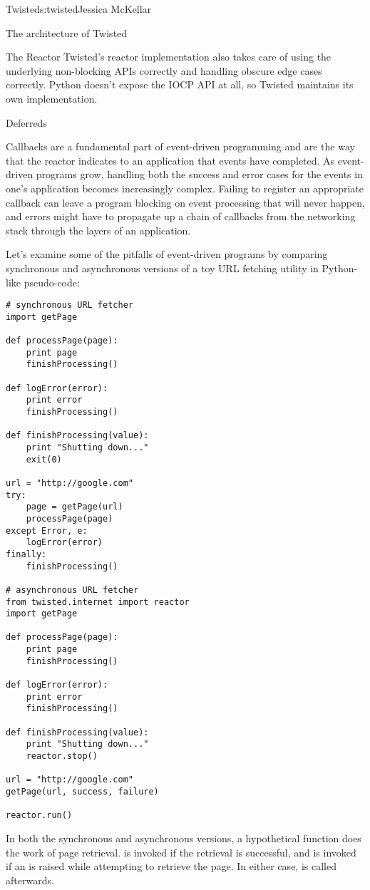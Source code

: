 \begin{aosachapter}{Twisted}{s:twisted}{Jessica McKellar}
\begin{aosasect1}{The architecture of Twisted}
\begin{aosasect2}{The Reactor}
Twisted's reactor implementation also takes care of using the underlying
non-blocking APIs correctly and handling obscure edge cases correctly. Python
doesn't expose the IOCP API at all, so Twisted maintains its own
implementation.

\end{aosasect2}

\begin{aosasect2}{Deferreds}

Callbacks are a fundamental part of event-driven programming and are the way
that the reactor indicates to an application that events have completed. As
event-driven programs grow, handling both the success and error cases for the
events in one's application becomes increasingly complex. Failing to register an
appropriate callback can leave a program blocking on event processing that will
never happen, and errors might have to propagate up a chain of callbacks from
the networking stack through the layers of an application.

Let's examine some of the pitfalls of event-driven programs by comparing
synchronous and asynchronous versions of a toy URL fetching utility in
Python-like pseudo-code:

\begin{verbatim}
# synchronous URL fetcher
import getPage

def processPage(page):
    print page
    finishProcessing()

def logError(error):
    print error
    finishProcessing()

def finishProcessing(value):
    print "Shutting down..."
    exit(0)

url = "http://google.com"
try:
    page = getPage(url)
    processPage(page)
except Error, e:
    logError(error)
finally:
    finishProcessing()

# asynchronous URL fetcher
from twisted.internet import reactor
import getPage

def processPage(page):
    print page
    finishProcessing()

def logError(error):
    print error
    finishProcessing()

def finishProcessing(value):
    print "Shutting down..."
    reactor.stop()

url = "http://google.com"
getPage(url, success, failure)

reactor.run()
\end{verbatim}

In both the synchronous and asynchronous versions, a hypothetical
 function does the work of page
retrieval.  is invoked if the retrieval is successful,
and  is invoked if an  is raised
while attempting to retrieve the page. In either case,
 is called afterwards.


\end{aosasect2}
\end{aosasect1}
\end{aosachapter}
